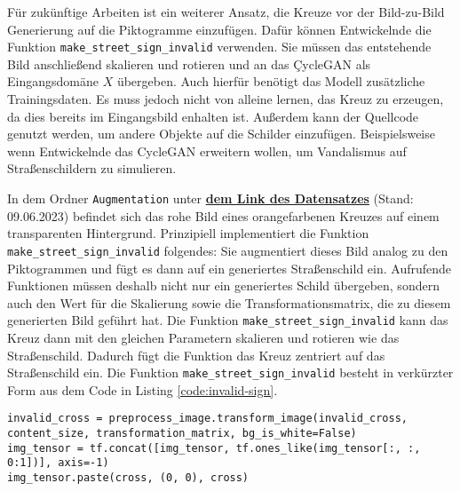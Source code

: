 Für zukünftige Arbeiten ist ein weiterer Ansatz, die Kreuze vor der Bild-zu-Bild Generierung auf die Piktogramme einzufügen. Dafür können Entwickelnde die Funktion \texttt{make_street_sign_invalid} verwenden. Sie müssen das entstehende Bild anschließend skalieren und rotieren und an das \c{CycleGAN} als Eingangsdomäne $X$ übergeben. Auch hierfür benötigt das Modell zusätzliche Trainingsdaten. Es muss jedoch nicht von alleine lernen, das Kreuz zu erzeugen, da dies bereits im Eingangsbild enhalten ist. Außerdem kann der Quellcode genutzt werden, um andere Objekte auf die Schilder einzufügen. Beispielsweise wenn Entwickelnde das \ac{CycleGAN} erweitern wollen, um Vandalismus auf Straßenschildern zu simulieren.

In dem Ordner \texttt{Augmentation} unter \href{https://drive.google.com/drive/u/1/folders/1UlZNFEDLymyMFw2BJZcfB2toAIlTVwGb}{\textbf{dem Link des Datensatzes}} (Stand: 09.06.2023) befindet sich das rohe Bild eines orangefarbenen Kreuzes auf einem transparenten Hintergrund. Prinzipiell implementiert die Funktion \texttt{make_street_sign_invalid} folgendes: Sie augmentiert dieses Bild analog zu den Piktogrammen und fügt es dann auf ein generiertes Straßenschild ein. Aufrufende Funktionen müssen deshalb nicht nur ein generiertes Schild übergeben, sondern auch den Wert für die Skalierung sowie die Transformationsmatrix, die zu diesem generierten Bild geführt hat. Die Funktion \texttt{make_street_sign_invalid} kann das Kreuz dann mit den gleichen Parametern skalieren und rotieren wie das Straßenschild. Dadurch fügt die Funktion das Kreuz zentriert auf das Straßenschild ein. Die Funktion \texttt{make_street_sign_invalid} besteht in verkürzter Form aus dem Code in Listing \ref{code:invalid-sign}.

\begin{code}
	\begin{verbatim}
invalid_cross = preprocess_image.transform_image(invalid_cross, content_size, transformation_matrix, bg_is_white=False)
img_tensor = tf.concat([img_tensor, tf.ones_like(img_tensor[:, :, 0:1])], axis=-1)
img_tensor.paste(cross, (0, 0), cross)
	\end{verbatim}
\end{code}


